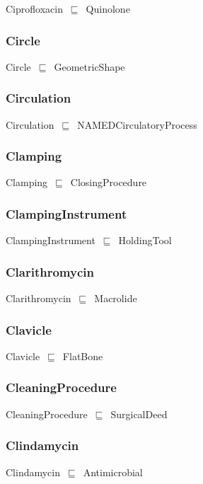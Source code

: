 \documentclass{article}
\begin{document}
Ciprofloxacin~\ensuremath{\sqsubseteq}~Quinolone~

\subsubsection*{Circle}

Circle~\ensuremath{\sqsubseteq}~GeometricShape~

\subsubsection*{Circulation}

Circulation~\ensuremath{\sqsubseteq}~NAMEDCirculatoryProcess~

\subsubsection*{Clamping}

Clamping~\ensuremath{\sqsubseteq}~ClosingProcedure~

\subsubsection*{ClampingInstrument}

ClampingInstrument~\ensuremath{\sqsubseteq}~HoldingTool~

\subsubsection*{Clarithromycin}

Clarithromycin~\ensuremath{\sqsubseteq}~Macrolide~

\subsubsection*{Clavicle}

Clavicle~\ensuremath{\sqsubseteq}~FlatBone~

\subsubsection*{CleaningProcedure}

CleaningProcedure~\ensuremath{\sqsubseteq}~SurgicalDeed~

\subsubsection*{Clindamycin}

Clindamycin~\ensuremath{\sqsubseteq}~Antimicrobial~
\end{document}
